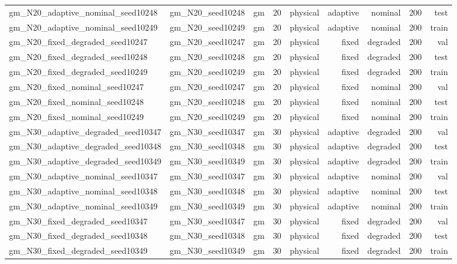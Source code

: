 \begin{tabular}{lrrrrrrrr}
gm\_N20\_adaptive\_nominal\_seed10248 & gm\_N20\_seed10248 & gm & 20 & physical & adaptive & nominal & 200 & test \\
gm\_N20\_adaptive\_nominal\_seed10249 & gm\_N20\_seed10249 & gm & 20 & physical & adaptive & nominal & 200 & train \\
gm\_N20\_fixed\_degraded\_seed10247 & gm\_N20\_seed10247 & gm & 20 & physical & fixed & degraded & 200 & val \\
gm\_N20\_fixed\_degraded\_seed10248 & gm\_N20\_seed10248 & gm & 20 & physical & fixed & degraded & 200 & test \\
gm\_N20\_fixed\_degraded\_seed10249 & gm\_N20\_seed10249 & gm & 20 & physical & fixed & degraded & 200 & train \\
gm\_N20\_fixed\_nominal\_seed10247 & gm\_N20\_seed10247 & gm & 20 & physical & fixed & nominal & 200 & val \\
gm\_N20\_fixed\_nominal\_seed10248 & gm\_N20\_seed10248 & gm & 20 & physical & fixed & nominal & 200 & test \\
gm\_N20\_fixed\_nominal\_seed10249 & gm\_N20\_seed10249 & gm & 20 & physical & fixed & nominal & 200 & train \\
gm\_N30\_adaptive\_degraded\_seed10347 & gm\_N30\_seed10347 & gm & 30 & physical & adaptive & degraded & 200 & val \\
gm\_N30\_adaptive\_degraded\_seed10348 & gm\_N30\_seed10348 & gm & 30 & physical & adaptive & degraded & 200 & test \\
gm\_N30\_adaptive\_degraded\_seed10349 & gm\_N30\_seed10349 & gm & 30 & physical & adaptive & degraded & 200 & train \\
gm\_N30\_adaptive\_nominal\_seed10347 & gm\_N30\_seed10347 & gm & 30 & physical & adaptive & nominal & 200 & val \\
gm\_N30\_adaptive\_nominal\_seed10348 & gm\_N30\_seed10348 & gm & 30 & physical & adaptive & nominal & 200 & test \\
gm\_N30\_adaptive\_nominal\_seed10349 & gm\_N30\_seed10349 & gm & 30 & physical & adaptive & nominal & 200 & train \\
gm\_N30\_fixed\_degraded\_seed10347 & gm\_N30\_seed10347 & gm & 30 & physical & fixed & degraded & 200 & val \\
gm\_N30\_fixed\_degraded\_seed10348 & gm\_N30\_seed10348 & gm & 30 & physical & fixed & degraded & 200 & test \\
gm\_N30\_fixed\_degraded\_seed10349 & gm\_N30\_seed10349 & gm & 30 & physical & fixed & degraded & 200 & train \\

\end{tabular}
